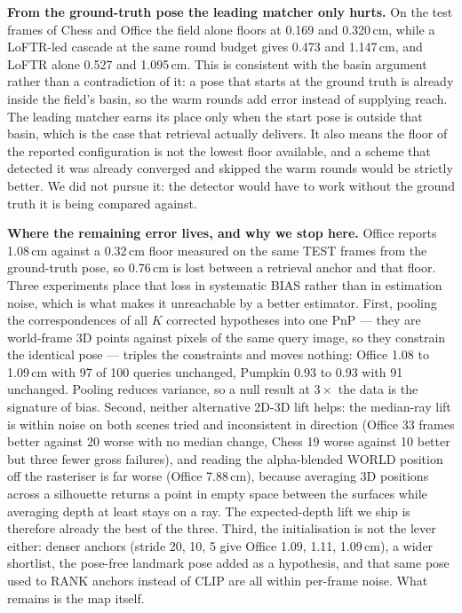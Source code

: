 \documentclass[journal]{IEEEtran}
\begin{document}
\textbf{From the ground-truth pose the leading matcher only hurts.} On the test
frames of Chess and Office the field alone floors at 0.169 and 0.320\,cm, while
a LoFTR-led cascade at the same round budget gives 0.473 and 1.147\,cm, and
LoFTR alone 0.527 and 1.095\,cm. This is consistent with the basin argument
rather than a contradiction of it: a pose that starts at the ground truth is
already inside the field's basin, so the warm rounds add error instead of
supplying reach. The leading matcher earns its place only when the start pose is
outside that basin, which is the case that retrieval actually delivers. It also
means the floor of the reported configuration is not the lowest floor available,
and a scheme that detected it was already converged and skipped the warm rounds
would be strictly better. We did not pursue it: the detector would have to work
without the ground truth it is being compared against.

\textbf{Where the remaining error lives, and why we stop here.} Office reports
1.08\,cm against a 0.32\,cm floor measured on the same TEST frames from the
ground-truth pose, so 0.76\,cm is lost between a retrieval anchor and that
floor. Three experiments place that loss in systematic BIAS rather than in
estimation noise, which is what makes it unreachable by a better estimator.
First, pooling the correspondences of all $K$ corrected hypotheses into one PnP
--- they are world-frame 3D points against pixels of the same query image, so
they constrain the identical pose --- triples the constraints and moves nothing:
Office 1.08 to 1.09\,cm with 97 of 100 queries unchanged, Pumpkin 0.93 to
0.93 with 91 unchanged. Pooling reduces variance, so a null result at $3\times$
the data is the signature of bias. Second, neither alternative 2D-3D lift helps:
the median-ray lift is within noise on both scenes tried and inconsistent in
direction (Office 33 frames better against 20 worse with no median change,
Chess 19 worse against 10 better but three fewer gross failures), and reading
the alpha-blended WORLD position off the rasteriser is far worse (Office
7.88\,cm), because averaging 3D positions across a silhouette returns a point in
empty space between the surfaces while averaging depth at least stays on a ray.
The expected-depth lift we ship is therefore already the best of the three.
Third, the initialisation is not the lever either: denser anchors (stride 20,
10, 5 give Office 1.09, 1.11, 1.09\,cm), a wider shortlist, the pose-free
landmark pose added as a hypothesis, and that same pose used to RANK anchors
instead of CLIP are all within per-frame noise. What remains is the map itself.
\end{document}
